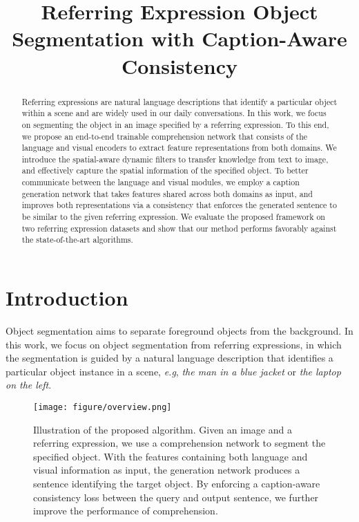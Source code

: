 \documentclass{bmvc2k}
\title{Referring Expression Object Segmentation with Caption-Aware Consistency}
\def\eg{\emph{e.g}\bmvaOneDot}
\begin{document}
\maketitle

\begin{abstract}
Referring expressions are natural language descriptions that identify a particular object within a scene and are widely used in our daily conversations. 
In this work, we focus on segmenting the object in an image specified by a referring expression.
To this end, we propose an end-to-end trainable comprehension network that consists of the language and visual encoders to extract feature representations from both domains.
We introduce the spatial-aware dynamic filters to transfer knowledge from text to image, and effectively capture the spatial information of the specified object.
To better communicate between the language and visual modules, we employ a caption generation network that takes features shared across both domains as input, and improves both representations via a consistency that enforces the generated sentence to be similar to the given referring expression.
We evaluate the proposed framework on two referring expression datasets and show that our method performs favorably against the state-of-the-art algorithms.

\end{abstract}

\section{Introduction}

Object segmentation aims to separate foreground objects from the background.
In this work, we focus on object segmentation from referring expressions, in which the segmentation is guided by a natural language description that identifies a particular object instance in a scene, \eg, {\em the man in a blue jacket} or {\em the laptop on the left}.
\begin{figure}[htp]
	\centering
	\texttt{[image: figure/overview.png]}
	\caption{Illustration of the proposed algorithm. Given an image and a referring expression, we use a comprehension network to segment the specified object. With the features containing both language and visual information as input, the generation network produces a sentence identifying the target object. By enforcing a caption-aware consistency loss between the query and output sentence, we further improve the performance of comprehension.}
	\label{fig:overview}
	\vspace{-3mm}
\end{figure}
\end{document}
